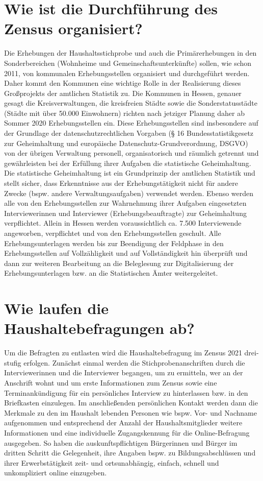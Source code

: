 \section[Wer erhebt?]{Wie ist die Durchführung des Zensus organisiert?}
Die Erhebungen der Haushaltsstichprobe und auch die Primärerhebungen in den Sonderbereichen (Wohnheime und Gemeinschaftsunterkünfte) sollen, wie schon 2011, von kommunalen Erhebungsstellen organisiert und durchgeführt werden. Daher kommt den Kommunen eine wichtige Rolle in der Realisierung dieses Großprojekts der amtlichen Statistik zu. Die Kommunen in Hessen, genauer gesagt die Kreisverwaltungen, die kreisfreien Städte sowie die Sonderstatusstädte (Städte mit über 50.000 Einwohnern) richten nach jetziger Planung daher ab Sommer 2020 Erhebungsstellen ein. Diese Erhebungsstellen sind insbesondere auf der Grundlage der datenschutzrechtlichen Vorgaben (§ 16 Bundesstatistikgesetz zur Geheimhaltung und europäische Datenschutz-Grundverordnung, DSGVO) von der übrigen Verwaltung personell, organisatorisch und räumlich getrennt und gewährleisten bei der Erfüllung ihrer Aufgaben die statistische Geheimhaltung. Die statistische Geheimhaltung ist ein Grundprinzip der amtlichen Statistik und stellt sicher, dass Erkenntnisse aus der Erhebungstätigkeit nicht für andere Zwecke (bspw. andere Verwaltungsaufgaben) verwendet werden. Ebenso werden alle von den Erhebungsstellen zur Wahrnehmung ihrer Aufgaben eingesetzten Interviewerinnen und Interviewer (Erhebungsbeauftragte) zur Geheimhaltung verpflichtet. Allein in Hessen werden voraussichtlich ca. 7.500 Interviewende angeworben, verpflichtet und von den Erhebungsstellen geschult. Alle Erhebungsunterlagen werden bis zur Beendigung der Feldphase in den Erhebungsstellen auf Vollzähligkeit und auf Vollständigkeit hin überprüft und dann zur weiteren Bearbeitung an die Beleglesung zur Digitalisierung der Erhebungsunterlagen bzw. an die Statistischen Ämter weitergeleitet.

\section[Wie wird erhoben?]{Wie laufen die Haushaltebefragungen ab?}
Um die Befragten zu entlasten wird die Haushaltebefragung im Zensus 2021 drei-stufig erfolgen. Zunächst einmal werden die Stichprobenanschriften durch die Interviewerinnen und die Interviewer begangen, um zu ermitteln, wer an der Anschrift wohnt und um erste Informationen zum Zensus sowie eine Terminankündigung für ein persönliches Interview zu hinterlassen bzw. in den Briefkasten einzulegen. Im anschließenden persönlichen Kontakt werden dann die Merkmale zu den im Haushalt lebenden Personen wie bspw. Vor- und Nachname aufgenommen und entsprechend der Anzahl der Haushaltsmitglieder weitere Informationen und eine individuelle Zugangskennung für die Online-Befragung ausgegeben. So haben die auskunftspflichtigen Bürgerinnen und Bürger im dritten Schritt die Gelegenheit, ihre Angaben bspw. zu Bildungsabschlüssen und ihrer Erwerbstätigkeit zeit- und ortsunabhängig, einfach, schnell und unkompliziert online einzugeben.\par

